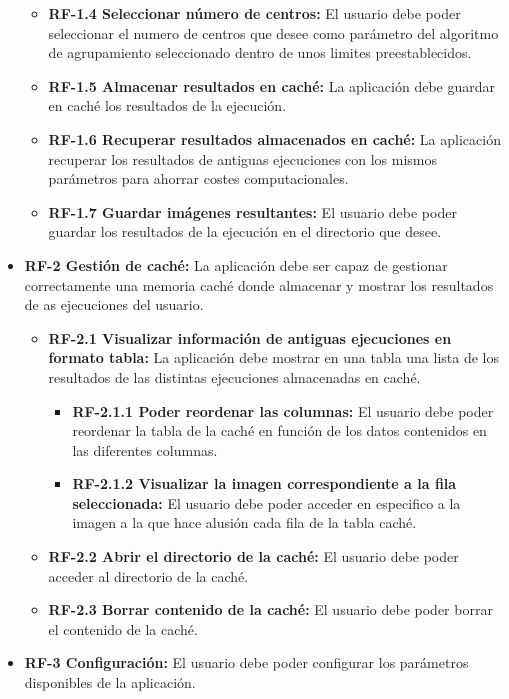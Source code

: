 \begin{itemize}
\begin{itemize}
        \item \textbf{RF-1.4 Seleccionar número de centros:} El usuario debe poder seleccionar el numero de centros que desee como parámetro del algoritmo de agrupamiento seleccionado dentro de unos limites preestablecidos.
        \item \textbf{RF-1.5 Almacenar resultados en caché:} La aplicación debe guardar en caché los resultados de la ejecución.
        \item \textbf{RF-1.6 Recuperar resultados almacenados en caché:} La aplicación recuperar los resultados de antiguas ejecuciones con los mismos parámetros para ahorrar costes computacionales.
        \item \textbf{RF-1.7 Guardar imágenes resultantes:} El usuario debe poder guardar los resultados de la ejecución en el directorio que desee.
    \end{itemize}
    \item \textbf{RF-2 Gestión de caché:} La aplicación debe ser capaz de gestionar correctamente una memoria caché donde almacenar y mostrar los resultados de as ejecuciones del usuario.
    \begin{itemize}
        \item \textbf{RF-2.1 Visualizar información de antiguas ejecuciones en formato tabla:} La aplicación debe mostrar en una tabla una lista de los resultados de las distintas ejecuciones almacenadas en caché.
        \begin{itemize}
            \item \textbf{RF-2.1.1 Poder reordenar las columnas:} El usuario debe poder reordenar la tabla de la caché en función de los datos contenidos en las diferentes columnas.
            \item \textbf{RF-2.1.2 Visualizar la imagen correspondiente a la fila seleccionada:} El usuario debe poder acceder en especifico a la imagen a la que hace alusión cada fila de la tabla caché.
        \end{itemize}
        \item \textbf{RF-2.2 Abrir el directorio de la caché:} El usuario debe poder acceder al directorio de la caché.
        \item \textbf{RF-2.3 Borrar contenido de la caché:} El usuario debe poder borrar el contenido de la caché.
    \end{itemize}
    \item \textbf{RF-3 Configuración:} El usuario debe poder configurar los parámetros disponibles de la aplicación. 
    \begin{itemize}

\end{itemize}
\end{itemize}
